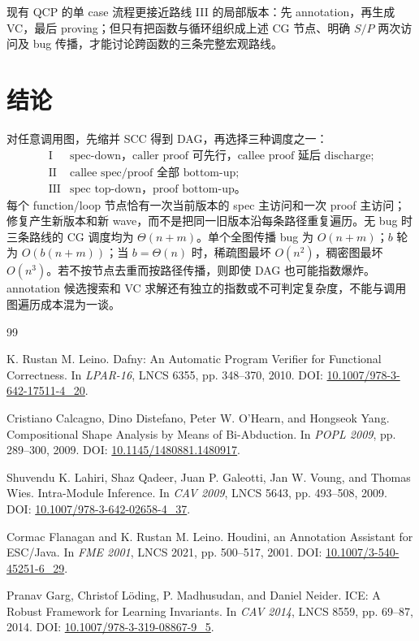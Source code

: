 \documentclass[UTF8,a4paper,11pt]{ctexart}
\begin{document}
现有 QCP 的单 case 流程更接近路线 III 的局部版本：先 annotation，再生成 VC，最后 proving；但只有把函数与循环组织成上述 CG 节点、明确 $S/P$ 两次访问及 bug 传播，才能讨论跨函数的三条完整宏观路线。

\section{结论}

对任意调用图，先缩并 SCC 得到 DAG，再选择三种调度之一：
\[
\begin{array}{ll}
\text{I}   & \text{spec-down，caller proof 可先行，callee proof 延后 discharge};\\
\text{II}  & \text{callee spec/proof 全部 bottom-up};\\
\text{III} & \text{spec top-down，proof bottom-up。}
\end{array}
\]
每个 function/loop 节点恰有一次当前版本的 spec 主访问和一次 proof 主访问；修复产生新版本和新 wave，而不是把同一旧版本沿每条路径重复遍历。无 bug 时三条路线的 CG 调度均为 $\Theta(n+m)$。单个全图传播 bug 为 $O(n+m)$；$b$ 轮为 $O(b(n+m))$；当 $b=\Theta(n)$ 时，稀疏图最坏 $O(n^2)$，稠密图最坏 $O(n^3)$。若不按节点去重而按路径传播，则即使 DAG 也可能指数爆炸。annotation 候选搜索和 VC 求解还有独立的指数或不可判定复杂度，不能与调用图遍历成本混为一谈。

\begin{thebibliography}{99}

K. Rustan M. Leino.
\newblock Dafny: An Automatic Program Verifier for Functional Correctness.
\newblock In \emph{LPAR-16}, LNCS 6355, pp. 348--370, 2010.
\newblock DOI: \href{https://doi.org/10.1007/978-3-642-17511-4_20}{10.1007/978-3-642-17511-4\_20}.

Cristiano Calcagno, Dino Distefano, Peter W. O'Hearn, and Hongseok Yang.
\newblock Compositional Shape Analysis by Means of Bi-Abduction.
\newblock In \emph{POPL 2009}, pp. 289--300, 2009.
\newblock DOI: \href{https://doi.org/10.1145/1480881.1480917}{10.1145/1480881.1480917}.

Shuvendu K. Lahiri, Shaz Qadeer, Juan P. Galeotti, Jan W. Voung, and Thomas Wies.
\newblock Intra-Module Inference.
\newblock In \emph{CAV 2009}, LNCS 5643, pp. 493--508, 2009.
\newblock DOI: \href{https://doi.org/10.1007/978-3-642-02658-4_37}{10.1007/978-3-642-02658-4\_37}.

Cormac Flanagan and K. Rustan M. Leino.
\newblock Houdini, an Annotation Assistant for ESC/Java.
\newblock In \emph{FME 2001}, LNCS 2021, pp. 500--517, 2001.
\newblock DOI: \href{https://doi.org/10.1007/3-540-45251-6_29}{10.1007/3-540-45251-6\_29}.

Pranav Garg, Christof L\"oding, P. Madhusudan, and Daniel Neider.
\newblock ICE: A Robust Framework for Learning Invariants.
\newblock In \emph{CAV 2014}, LNCS 8559, pp. 69--87, 2014.
\newblock DOI: \href{https://doi.org/10.1007/978-3-319-08867-9_5}{10.1007/978-3-319-08867-9\_5}.

\end{thebibliography}
\end{document}
